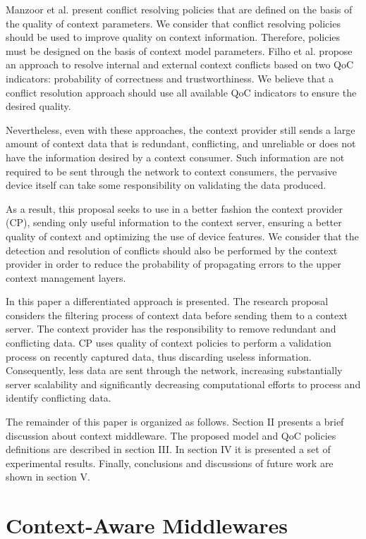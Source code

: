\documentclass[letterpaper,conference]{IEEEtran}
\begin{document}
Manzoor et al. \cite{manzoor2009using} present conflict resolving policies that are 
defined on the basis of the quality of context parameters. We consider that conflict 
resolving policies should be used to improve quality on context information. Therefore, 
policies must be designed on the basis of context model parameters. Filho et al. \cite{agoulmine2011quality} 
propose an approach to resolve internal and external context conflicts based on two QoC 
indicators: probability of correctness and trustworthiness. We believe that a conflict 
resolution approach should use all available QoC indicators to ensure the desired quality.

Nevertheless, even with these approaches, the context provider still sends a large 
amount of context data that is redundant, conflicting, and unreliable or does not have 
the information desired by a context consumer. Such information are not required to be 
sent through the network to context consumers, the pervasive device itself can take 
some responsibility on validating the data produced.

As a result, this proposal seeks to use in a better fashion the context provider (CP), 
sending only useful information to the context server, ensuring a better quality of 
context and optimizing the use of device features. We consider that the detection and 
resolution of conflicts should also be performed by the context provider in order to 
reduce the probability of propagating errors to the upper context management layers.

In this paper a differentiated approach is presented. The research proposal considers 
the filtering process of context data before sending them to a context server. The 
context provider has the responsibility to remove redundant and conflicting data. CP 
uses quality of context policies to perform a validation process on recently captured 
data, thus discarding useless information. Consequently, less data are sent through the 
network, increasing substantially server scalability and significantly decreasing 
computational efforts to process and identify conflicting data. 

The remainder of this paper is organized as follows. Section II presents a brief
discussion about context middleware. The proposed model and QoC policies definitions are 
described in section III. In section IV it is presented a set of experimental results. 
Finally, conclusions and discussions of future work are shown in section V.

 \section{Context-Aware Middlewares} 
\end{document}
